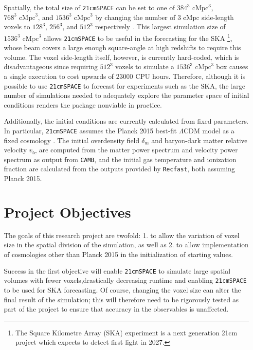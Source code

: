 \documentclass[floats,floatfix,showpacs,amssymb,prd,superscriptaddress,nofootinbib]{revtex4-2} %
\newcommand{\code}{\texttt}
\begin{document}
Spatially, the total size of \code{21cmSPACE} can be set to one of $384^3 \text{ cMpc}^3$, $768^3 \text{ cMpc}^3$, and $1536^3 \text{ cMpc}^3$ by changing the number of $3 \text{ cMpc}$ side-length voxels to $128^3$, $256^3$, and $512^3$ respectively \cite{dhandha_2022}. This largest simulation size of $1536^3 \text{ cMpc}^3$ allows \code{21cmSPACE} to be useful in the forecasting for the SKA \footnote{The Square Kilometre Array (SKA) experiment is a next generation 21cm project which expects to detect first light in 2027.}, whose beam covers a large enough square-angle at high redshifts to require this volume. The voxel side-length itself, however, is currently hard-coded, which is disadvantageous since requiring $512^3$ voxels to simulate a $1536^3 \text{ cMpc}^3$ box causes a single execution to cost upwards of 23000 CPU hours. Therefore, although it is possible to use \code{21cmSPACE} to forecast for experiments such as the SKA, the large number of simulations needed to adequately explore the parameter space of initial conditions renders the package nonviable in practice.


Additionally, the initial conditions are currently calculated from fixed parameters. In particular, \code{21cmSPACE} assumes the Planck 2015 best-fit $\Lambda$CDM model as a fixed cosmology \cite{Planck_2016}. The initial overdensity field $\delta_m$ and baryon-dark matter relative velocity $v_{bc}$ are computed \cite{Fialkov_2012} from the matter power spectrum and velocity power spectrum as output from \code{CAMB}, and the initial gas temperature and ionization fraction are calculated from the outputs provided by \code{Recfast}, both assuming Planck 2015.

\section{Project Objectives}

The goals of this research project are twofold: 1. to allow the variation of voxel size in the spatial division of the simulation, as well as 2. to allow implementation of cosmologies other than Planck 2015 in the initialization of starting values. 

Success in the first objective will enable \code{21cmSPACE} to simulate large spatial volumes with fewer voxels,drastically decreasing runtime and enabling \code{21cmSPACE} to be used for SKA forecasting. Of course, changing the voxel size can alter the final result of the simulation; this will therefore need to be rigorously tested as part of the project to ensure that accuracy in the observables is unaffected. 
\end{document}
